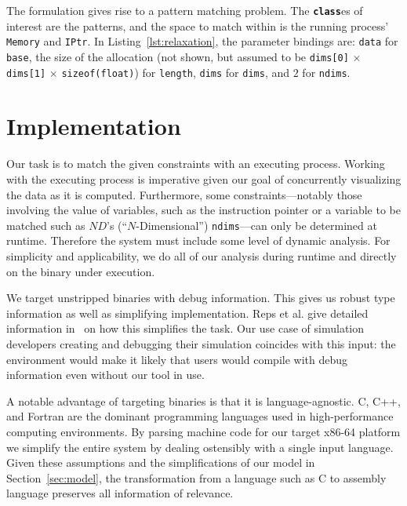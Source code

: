 The formulation gives rise to a pattern matching problem.  The
\texttt{\textbf{class}}es of interest are the patterns, and the space
to match within is the running process' \texttt{Memory} and
\texttt{IPtr}.  In Listing~\ref{lst:relaxation}, the parameter bindings are:
\texttt{data} for \texttt{base}, the size of the allocation (not shown, but
assumed to be \texttt{dims[0]} $\times$ \texttt{dims[1]} $\times$
\texttt{sizeof(float)}) for
\texttt{length}, \texttt{dims} for \texttt{dims}, and $2$ for
\texttt{ndims}.

\section{Implementation}

Our task is to match the given constraints with an executing process.
Working with the executing process is imperative given our goal of
concurrently visualizing the data as it is computed.  Furthermore, some
constraints---notably those involving the value of variables, such as
the instruction pointer or a variable to be matched such as $ND$'s
(``$N$-Dimensional'')
\texttt{ndims}---can only be determined at runtime.  Therefore the
system must include some level of dynamic analysis.  For simplicity and
applicability, we do all of our analysis during runtime and directly on
the binary under execution.

We target unstripped binaries with debug information.  This gives us
robust type information as well as simplifying implementation.
Reps et al. give detailed information in~\cite{Reps:2010:Bottom} on
how this simplifies the task. Our use case of simulation developers
creating and debugging their simulation coincides with this input: the
environment would make it likely that users would compile with debug
information even without our tool in use.

A notable advantage of targeting binaries is that it is
language-agnostic.  C, C++, and Fortran are the dominant programming
languages used in high-performance computing environments.  By parsing
machine code for our target x86-64 platform we simplify the entire
system by dealing ostensibly with a single input language.  %
Given these assumptions and the simplifications of our model in
Section~\ref{sec:model}, the transformation from a language such
as C to assembly language preserves all information of relevance.

